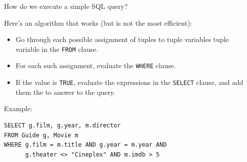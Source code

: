 \documentclass[xcolor={usenames,dvipsnames}]{beamer}
\begin{document}
\begin{frame}[fragile]{How do we execute a simple SQL query?}

Here's an algorithm that works (but is not the most efficient):

\begin{itemize}[-]
\item Go through each possible assignment of tuples to tuple variables tuple variable in the \lstinline[style=SQL]{FROM} clause.
\item For each such assignment, evaluate the \lstinline[style=SQL]{WHERE} clause.
\item If the value is \lstinline[style=SQL]{TRUE}, evaluate the expressions in the \lstinline[style=SQL]{SELECT} clause, and add them the to answer to the query.
\end{itemize}


Example:

\begin{lstlisting}[style=SQL]
SELECT g.film, g.year, m.director
FROM Guide g, Movie m
WHERE g.film = m.title AND g.year = m.year AND
      g.theater <> "Cineplex" AND m.imdb > 5 
\end{lstlisting}      



\end{frame}

\def\TableExpressions{\mathcal{T}}
\def\ValueExpressions{\mathcal{V}}
\def\Predicates{\mathcal{P}}
\def\VE{\mathit{ve}}
\def\TE{\mathit{te}}

%
%
\end{document}
